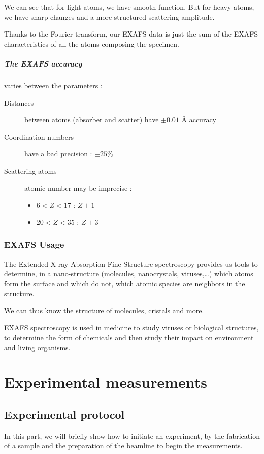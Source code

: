 \documentclass[11pt,a4paper,oneside]{report}
\begin{document}
We can see that for light atoms, we have smooth function. But for heavy atoms, we have sharp changes and a more structured scattering amplitude.

Thanks to the Fourier transform, our EXAFS data is just the sum of the EXAFS characteristics of all the atoms composing the specimen.

\paragraph{The EXAFS accuracy} varies between the parameters : 
\begin{description}
    \item[Distances] between atoms (absorber and scatter) have $\pm 0.01 $ \AA\; accuracy
    \item[Coordination numbers] have a bad precision : $\pm 25\%$
    \item[Scattering atoms] atomic number may be imprecise :
    \begin{itemize}
        \item $6<Z<17$ : $Z \pm 1$
        \item $20<Z<35$ : $Z \pm 3$
    \end{itemize}
\end{description}



\subsection{EXAFS Usage}
The Extended X-ray Absorption Fine Structure spectroscopy provides us tools to determine, in a nano-structure (molecules, nanocrystals, viruses,…) which atoms form the surface and which do not, which atomic species are neighbors in the structure.

We can thus know the structure of molecules, cristals and more.

EXAFS spectroscopy is used in medicine to study viruses or biological structures, to determine the form of chemicals and then study their impact on environment and living organisms.




\newpage
\chapter{Experimental measurements}

\section{Experimental protocol}
In this part, we will briefly show how to initiate an experiment, by the fabrication of a sample and the preparation of the beamline to begin the measurements.
\end{document}
